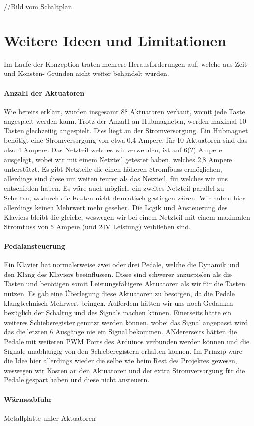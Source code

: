 //Bild vom Schaltplan


\section{Weitere Ideen und Limitationen}

Im Laufe der Konzeption traten mehrere Herausforderungen auf, welche aus Zeit- und Konsten- Gründen nicht weiter
behandelt wurden.
\paragraph{Anzahl der Aktuatoren}
Wie bereits erklärt, wurden insgesamt 88 Aktuatoren verbaut, womit jede Taste angespielt werden kann. Trotz der Anzahl an
Hubmagneten, werden maximal 10 Tasten glechzeitig angespielt. Dies liegt an der Stromversorgung. Ein Hubmagnet benötigt
eine Stromversorgung von etwa 0.4 Ampere, für 10 Aktuatoren sind das also 4 Ampere. Das Netzteil welches wir verwenden, ist auf
6(?) Ampere ausgelegt, wobei wir mit einem Netzteil getestet haben, welches 2,8 Ampere unterstützt. Es gibt Netzteile die
einen höheren Stromföuss ermöglichen, allerdings sind diese um weiten teurer als das Netzteil, für welches wir uns entschieden haben.
Es wäre auch möglich, ein zweites Netzteil parallel zu Schalten, wodurch die Kosten nicht dramatisch gestiegen wären.
Wir haben hier allerdings keinen Mehrwert mehr gesehen. Die Logik und Ansteuerung des Klaviers bleibt die gleiche, weswegen
wir bei einem Netzteil mit einem maximalen Stromfluss von 6 Ampere (und 24V Leistung) verblieben sind.

\paragraph{Pedalansteuerung}
Ein Klavier hat normalerweise zwei oder drei Pedale, welche die Dynamik und den Klang des Klaviers beeinflussen.
Diese sind schwerer anzuspielen als die Tasten und benötigen somit Leistungsfähigere Aktuatoren als wir für die Tasten nutzen.
Es gab eine Überlegung diese Aktuatoren zu besorgen, da die Pedale klangtechnisch Mehrwert bringen.
Außerdem hätten wir uns noch Gedanken bezüglich der Schaltug und des Signals machen können.
Einerseits hätte ein weiteres Schieberegister genutzt werden können, wobei das Signal angepasst wird das die letzten 6 Ausgänge nie ein Signal bekommen.
ANdererseits hätten die Pedale mit weiteren \ac{PWM} Ports des Arduinos verbunden werden können und die Signale unabhängig von den
Schieberegistern erhalten können.
Im Prinzip wäre die Idee hier allerdings wieder die selbe wie beim Rest des Projektes gewesen,
weswegen wir Kosten an den Aktuatoren und der extra Stromversorgung für die Pedale gespart haben und diese nicht ansteuern.

\paragraph{Wärmeabfuhr}
Metallplatte unter Aktuatoren
